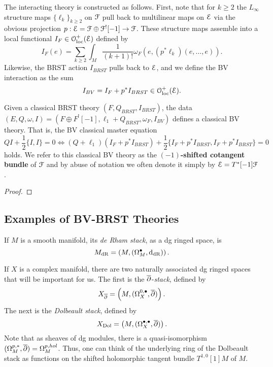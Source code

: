 \documentclass[10pt, oneside]{article}
\begin{document}
The interacting theory is constructed as follows.
First, note that for $k \geq 2$ the $L_\infty$ structure maps $\{\ell_k\}_{k \geq 2}$ on $\mathcal F$ pull back to multilinear maps on $\mathcal E$ via the obvious projection $p : \mathcal E = \mathcal F \oplus \mathcal F^![-1] \to \mathcal F$. 
These structure maps assemble into a local functional $I_F \in \mathcal{O}_{\rm loc}^+(\mathcal E)$ defined by
\[
I_{F} (e) = \sum_{k \geq 2} \int_M \frac{1}{(k+1)!} \omega_F(e, (p^*\ell_k) (e, \ldots, e)) . 
\] 
Likewise, the BRST action $I_{BRST}$ pulls back to $\mathcal E$, and we define the BV interaction as the sum
\[
I_{BV} = I_{F} + p^* I_{BRST} \in \mathcal{O}_{\rm loc}^+(\mathcal E) .
\]

\begin{lemma}
Given a classical BRST theory $(F, Q_{BRST}, I_{BRST})$, the data $(E, Q, \omega, I) = (F \oplus F^![-1] , \ell_1 + Q_{BRST} , \omega_F, I_{BV})$ defines a classical BV theory.
That is, the BV classical master equation
\[
Q I + \frac{1}{2} \{I, I\} = 0 \iff (Q + \ell_1) (I_F + p^*I_{BRST}) + \frac{1}{2} \{I_F + p^*I_{BRST}, I_F + p^*I_{BRST}\} = 0
\]
holds.
We refer to this classical BV theory as the {\bf $(-1)$-shifted cotangent bundle} of $\mathcal F$ and by abuse of notation we often denote it simply by $\mathcal E = T^*[-1] \mathcal F$.
\end{lemma}

\begin{proof}
\end{proof}


\subsection{Examples of BV-BRST Theories}


If $M$ is a smooth manifold, its {\em de Rham stack}, as a dg ringed space, is 
\[
M_{\rm dR} = \left(M , (\Omega^\bullet_M, {\rm d}_{\rm dR})\right) .
\] 

If $X$ is a complex manifold, there are two naturally associated dg ringed spaces that will be important for us. 
The first is the $\overline{\partial}$-{\em stack}, defined by
\[
X_{\overline{\partial}} = \left(M , (\Omega^{0,\bullet}_X, \overline{\partial}) \right) .
\]
The next is the {\em Dolbeault stack}, defined by
\[
X_{\rm Dol} = \left(M, (\Omega^{\bullet,\bullet}_X, \overline{\partial})\right) .
\] 
Note that as sheaves of dg modules, there is a quasi-isomorphism $(\Omega^{p,*}_M, \overline{\partial}) = \Omega^{p, hol}_M$.
Thus, one can think of the underlying ring of the Dolbeault stack as functions on the shifted holomorphic tangent bundle $T^{1,0} [1] M$ of $M$. 
\end{document}
